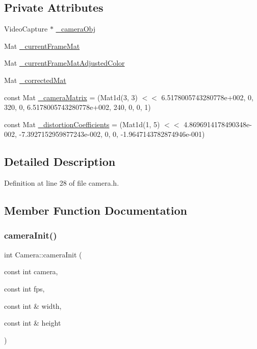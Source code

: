 \subsection*{Private Attributes}
\begin{DoxyCompactItemize}
\item 
Video\+Capture $\ast$ \mbox{\hyperlink{classCamera_a4b052388a85d60aaca71726e1d8dbea9}{\+\_\+camera\+Obj}}
\item 
Mat \mbox{\hyperlink{classCamera_af0a36cb5108ca656eccd85c58508ae5f}{\+\_\+current\+Frame\+Mat}}
\item 
Mat \mbox{\hyperlink{classCamera_aeeeed5ac66a515e73cb315df765834ef}{\+\_\+current\+Frame\+Mat\+Adjusted\+Color}}
\item 
Mat \mbox{\hyperlink{classCamera_aadacf0c0381546be20b9c707f8e88a42}{\+\_\+corrected\+Mat}}
\item 
const Mat \mbox{\hyperlink{classCamera_a1e024292a6e5481b8719ec16c34121e6}{\+\_\+camera\+Matrix}} = (Mat1d(3, 3) $<$$<$ 6.\+5178005743280778e+002, 0, 320, 0, 6.\+5178005743280778e+002, 240, 0, 0, 1)
\item 
const Mat \mbox{\hyperlink{classCamera_a1e62bd10af4149eab0ca79e1c39a11ea}{\+\_\+distortion\+Coefficients}} = (Mat1d(1, 5) $<$$<$ 4.\+8696914178490348e-\/002, -\/7.\+3927152959877243e-\/002, 0, 0, -\/1.\+9647143782874946e-\/001)
\end{DoxyCompactItemize}


\subsection{Detailed Description}


Definition at line 28 of file camera.\+h.



\subsection{Member Function Documentation}
\mbox{\label{classCamera_a6d17b81a1e987db60f5144d922f54e9d}} 
\subsubsection{\texorpdfstring{cameraInit()}{cameraInit()}}
{\footnotesize\ttfamily int Camera\+::camera\+Init (\begin{DoxyParamCaption}\item[{const int}]{camera,  }\item[{const int}]{fps,  }\item[{const int \&}]{width,  }\item[{const int \&}]{height }\end{DoxyParamCaption})}



